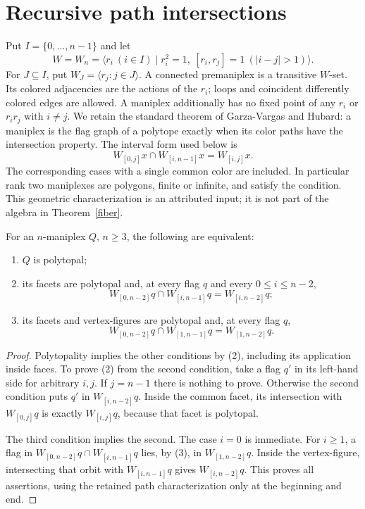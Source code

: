 \documentclass[a4paper,11pt]{article}
\newcommand{\gen}[1]{\langle#1\rangle}
\begin{document}
\section{Recursive path intersections}
Put $I=\{0,\ldots,n-1\}$ and let
\[
 W=W_n=\gen{r_i\ (i\in I)\mid r_i^2=1,\ [r_i,r_j]=1\ (|i-j|>1)}.
\]
For $J\subseteq I$, put $W_J=\gen{r_j:j\in J}$.
A connected premaniplex is a transitive $W$-set. Its colored adjacencies
are the actions of the $r_i$; loops and coincident differently colored
edges are allowed. A maniplex additionally has no fixed point of any
$r_i$ or $r_ir_j$ with $i\ne j$. We retain the standard theorem of
Garza-Vargas and Hubard: a maniplex is the flag graph of a polytope
exactly when its color paths have the intersection property. The interval
form used below is
\[
 W_{[0,j]}x\cap W_{[i,n-1]}x=W_{[i,j]}x.
                                                               \tag{2}
\]
The corresponding cases with a single common color are included. In
particular rank two maniplexes are polygons, finite or infinite, and
satisfy the condition. This geometric characterization is an attributed
input; it is not part of the algebra in Theorem~\ref{fiber}.

\begin{lemma}\label{recursive}
For an $n$-maniplex $Q$, $n\geq3$, the following are equivalent:
\begin{enumerate}
\item $Q$ is polytopal;
\item its facets are polytopal and, at every flag $q$ and every
$0\leq i\leq n-2$,
\[
 W_{[0,n-2]}q\cap W_{[i,n-1]}q=W_{[i,n-2]}q;
\]
\item its facets and vertex-figures are polytopal and, at every flag $q$,
\[
 W_{[0,n-2]}q\cap W_{[1,n-1]}q=W_{[1,n-2]}q.          \tag{3}
\]
\end{enumerate}
\end{lemma}
\begin{proof}
Polytopality implies the other conditions by (2), including its application
inside faces. To prove (2) from the second condition, take a flag $q'$ in
its left-hand side for arbitrary $i,j$. If $j=n-1$ there is nothing to
prove. Otherwise the second condition puts $q'$ in $W_{[i,n-2]}q$.
Inside the common facet, its intersection with $W_{[0,j]}q$ is exactly
$W_{[i,j]}q$, because that facet is polytopal.

The third condition implies the second. The case $i=0$ is immediate.
For $i\geq1$, a flag in
$W_{[0,n-2]}q\cap W_{[i,n-1]}q$ lies, by (3), in
$W_{[1,n-2]}q$. Inside the vertex-figure, intersecting that orbit with
$W_{[i,n-1]}q$ gives $W_{[i,n-2]}q$. This proves all assertions, using
the retained path characterization only at the beginning and end.
\end{proof}
\end{document}
